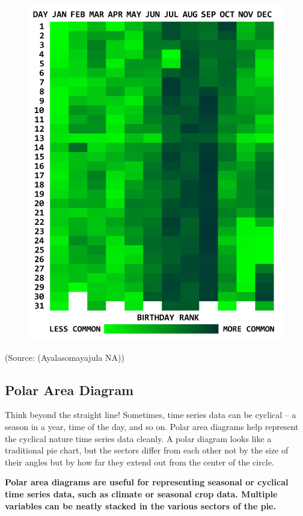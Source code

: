 \documentclass[]{book}
\theoremstyle{definition}
\theoremstyle{definition}
\theoremstyle{definition}
\theoremstyle{remark}
\begin{document}
\begin{figure}
\centering
\includegraphics{images/aya-heat-map.png}
\caption{}
\end{figure}

(Source: (Ayalasomayajula NA))

\subsection{Polar Area Diagram}\label{polar-area-diagram}

Think beyond the straight line! Sometimes, time series data can be
cyclical -- a season in a year, time of the day, and so on. Polar area
diagrams help represent the cyclical nature time series data cleanly. A
polar diagram looks like a traditional pie chart, but the sectors differ
from each other not by the size of their angles but by how far they
extend out from the center of the circle.

\textbf{Polar area diagrams are useful for representing seasonal or
cyclical time series data, such as climate or seasonal crop data.
Multiple variables can be neatly stacked in the various sectors of the
pie.}
\end{document}
